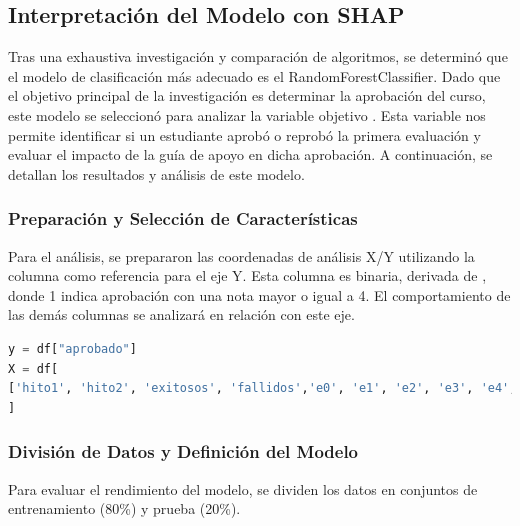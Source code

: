 \subsection{Interpretación del Modelo con SHAP}

Tras una exhaustiva investigación y comparación de algoritmos, se determinó que el modelo de clasificación más adecuado es el RandomForestClassifier. Dado que el objetivo principal de la investigación es determinar la aprobación del curso, este modelo se seleccionó para analizar la variable objetivo . Esta variable nos permite identificar si un estudiante aprobó o reprobó la primera evaluación y evaluar el impacto de la guía de apoyo en dicha aprobación. A continuación, se detallan los resultados y análisis de este modelo.

\subsubsection{Preparación y Selección de Características}

Para el análisis, se prepararon las coordenadas de análisis X/Y utilizando la columna  como referencia para el eje Y. Esta columna es binaria, derivada de , donde 1 indica aprobación con una nota mayor o igual a 4. El comportamiento de las demás columnas se analizará en relación con este eje.


\begin{lstlisting}[language=Python, caption=Selección de características y variable objetivo para RandomForestClassifier, label=lst:seleccion_caracteristicasRFC]
y = df["aprobado"]
X = df[
['hito1', 'hito2', 'exitosos', 'fallidos','e0', 'e1', 'e2', 'e3', 'e4', 'e5', 'e6', 'e7', 'e8', 'e9', 'e10', 'e11', 'e12', 'e13', 'e14', 'e15', 'e16', 'e17', 'e18', 'e19', 'e20', 'e21', 'e22', 'e23', 'e24', 'e25', 'e26', 'e27', 'e28', 'e29', 'e30', 'e31', 'e32', 'e33', 'e34', 'e35', 'e36', 'e37', 'e38', 'e39', 'e40', 'e41', 'e42', 'e43', 'e44', 'e45', 'e46', 'e47', 'e48', 'e49', 'e50', 'e51', 'e52']
]
    \end{lstlisting}

\subsubsection{División de Datos y Definición del Modelo}

Para evaluar el rendimiento del modelo, se dividen los datos en conjuntos de entrenamiento (80\%) y prueba (20\%).

